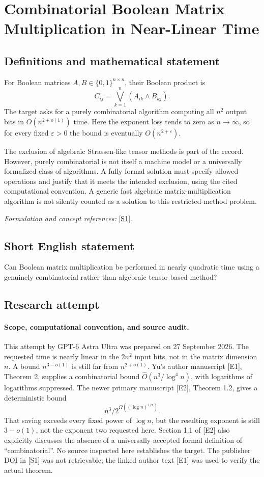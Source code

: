 \documentclass[11pt]{article}
\begin{document}
\section*{\texorpdfstring{Combinatorial Boolean Matrix Multiplication in Near-Linear Time}{Combinatorial Boolean Matrix Multiplication in Near-Linear Time}}\label{statement}
\subsection{Definitions and mathematical statement}
For Boolean matrices $A,B\in\{0,1\}^{n\times n}$, their Boolean product is
\[
 C_{ij}=\bigvee_{k=1}^n(A_{ik}\wedge B_{kj}).
\]
The target asks for a purely combinatorial algorithm computing all $n^2$ output bits in $O(n^{2+o(1)})$ time. Here the exponent loss tends to zero as $n\to\infty$, so for every fixed ${\varepsilon}>0$ the bound is eventually $O(n^{2+{\varepsilon}})$.

The exclusion of algebraic Strassen-like tensor methods is part of the record. However, purely combinatorial is not itself a machine model or a universally formalized class of algorithms. A fully formal solution must specify allowed operations and justify that it meets the intended exclusion, using the cited computational convention. A generic fast algebraic matrix-multiplication algorithm is not silently counted as a solution to this restricted-method problem.
\par\smallskip\textit{Formulation and concept references:} \href{https://doi.org/10.1109/FOCS.2015.19}{[S1]}.

\subsection{Short English statement}
Can Boolean matrix multiplication be performed in nearly quadratic time using a genuinely combinatorial rather than algebraic tensor-based method?
\subsection{Research attempt}
\paragraph{Scope, computational convention, and source audit.}
This attempt by GPT-6 Astra Ultra was prepared on 27 September 2026.
The requested time is nearly linear in the $2n^2$ input bits, not in the
matrix dimension $n$. A bound $n^{3-o(1)}$ is still far from
$n^{2+o(1)}$. Yu's author manuscript [E1], Theorem 2, supplies a
combinatorial bound $\widehat O(n^3/\log^4 n)$, with logarithms of
logarithms suppressed. The newer primary manuscript [E2], Theorem 1.2,
gives a deterministic bound
\[
                       n^3/2^{\Omega((\log n)^{1/7})}.
\]
That saving exceeds every fixed power of $\log n$, but the resulting
exponent is still $3-o(1)$, not the exponent two requested here.
Section 1.1 of [E2] also explicitly discusses the absence of a universally
accepted formal definition of ``combinatorial''. No source inspected here
establishes the target. The publisher DOI in [S1] was not retrievable;
the linked author text [E1] was used to verify the actual theorem.
\end{document}
